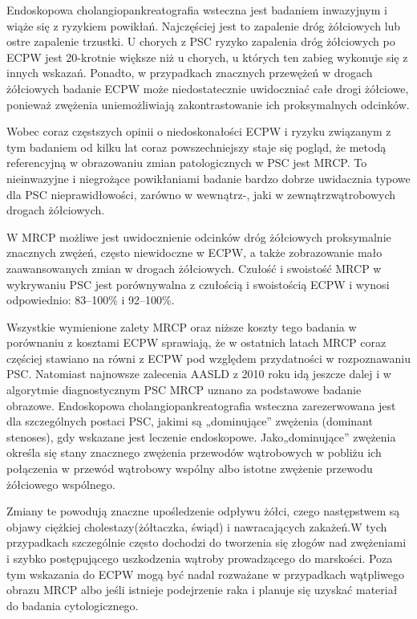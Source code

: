 Endoskopowa  cholangiopankreatografia wsteczna jest badaniem inwazyjnym i wiąże się z ryzykiem powikłań. Najczęściej jest to zapalenie  dróg  żółciowych  lub  ostre  zapalenie trzustki. 
U chorych z PSC ryzyko zapalenia dróg żółciowych po ECPW jest 20-krotnie większe  niż  u  chorych,  u  których  ten  zabieg wykonuje się z innych wskazań. 
Ponadto, w  przypadkach  znacznych przewężeń  w  drogach żółciowych badanie ECPW może niedostatecznie  uwidoczniać  całe  drogi  żółciowe, ponieważ zwężenia uniemożliwiają zakontrastowanie ich proksymalnych odcinków.

Wobec coraz  częstszych  opinii  o  niedoskonałości ECPW i ryzyku związanym z tym badaniem od kilku  lat  coraz  powszechniejszy  staje  się  pogląd, że metodą referencyjną w obrazowaniu zmian  patologicznych  w  PSC  jest  MRCP.  
To nieinwazyjne i niegrożące powikłaniami badanie bardzo dobrze uwidacznia typowe dla PSC nieprawidłowości,  zarówno  w  wewnątrz-,  jaki w zewnątrzwątrobowych drogach żółciowych. 

W MRCP możliwe jest uwidocznienie  odcinków  dróg  żółciowych  proksymalnie znacznych  zwężeń, często  niewidoczne w ECPW, a także zobrazowanie mało zaawansowanych  zmian  w  drogach  żółciowych.
Czułość i swoistość MRCP w wykrywaniu PSC jest porównywalna z czułością i swoistością  ECPW i wynosi  odpowiednio:  83–100\% i 92–100\%. 

Wszystkie wymienione zalety MRCP oraz niższe koszty tego badania w porównaniu z kosztami ECPW sprawiają, że w  ostatnich  latach  MRCP  coraz  częściej  stawiano na równi z ECPW pod względem przydatności w rozpoznawaniu PSC. 
Natomiast najnowsze zalecenia AASLD z 2010 roku idą jeszcze  dalej  i  w  algorytmie  diagnostycznym PSC  MRCP  uznano  za  podstawowe  badanie obrazowe.  
Endoskopowa  cholangiopankreatografia wsteczna zarezerwowana jest dla szczególnych postaci PSC, jakimi są „dominujące”  zwężenia  (dominant  stenoses), gdy wskazane jest leczenie endoskopowe. Jako„dominujące”  zwężenia  określa  się  stany znacznego zwężenia przewodów wątrobowych w pobliżu ich połączenia w przewód wątrobowy  wspólny  albo  istotne  zwężenie  przewodu żółciowego wspólnego.

Zmiany te powodują znaczne upośledzenie odpływu żółci, czego następstwem są objawy ciężkiej cholestazy(żółtaczka,  świąd)  i  nawracających  zakażeń.W tych przypadkach szczególnie często dochodzi  do  tworzenia  się  złogów  nad  zwężeniami i  szybko  postępującego  uszkodzenia  wątroby prowadzącego do marskości. 
Poza tym wskazania  do  ECPW  mogą  być  nadal  rozważane w przypadkach wątpliwego obrazu MRCP albo jeśli  istnieje  podejrzenie  raka  i  planuje  się uzyskać  materiał  do  badania  cytologicznego.

